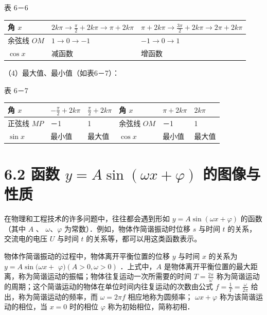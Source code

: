 \documentclass[10pt]{article}
\begin{document}
表 6－6

\begin{center}
\begin{tabular}{|l|l|l|}
\hline
角 \(x\) & \(2 k \pi \rightarrow \frac{\pi}{2}+2 k \pi \rightarrow \pi+2 k \pi\) & \(\pi+2 k \pi \rightarrow \frac{3 \pi}{2}+2 k \pi \rightarrow 2 \pi+2 k \pi\) \\
\hline
余弦线 \(O M\) & \(1 \rightarrow 0 \rightarrow-1\) & \(-1 \rightarrow 0 \rightarrow 1\) \\
\hline
\(\cos x\) & 减函数 & 增函数 \\
\hline
\end{tabular}
\end{center}

（4）最大值、最小值（如表6－7）：

表 6－7

\begin{center}
\begin{tabular}{|l|l|l|l|l|l|}
\hline
角 \(x\) & \(-\frac{\pi}{2}+2 k \pi\) & \(\frac{\pi}{2}+2 k \pi\) & 角 \(x\) & \(\pi+2 k \pi\) & \(2 k \pi\) \\
\hline
正弦线 \(M P\) & －1 & 1 & 余弦线 \(O M\) & －1 & 1 \\
\hline
\(\sin x\) & 最小值 & 最大值 & \(\cos x\) & 最小值 & 最大值 \\
\hline
\end{tabular}
\end{center}

\section*{6.2 函数 \(y=A \sin (\omega x+\varphi)\) 的图像与性质}
在物理和工程技术的许多问题中，往往都会遇到形如 \(y=A \sin (\omega x+\varphi)\) 的函数（其中 \(A\) 、 \(\omega 、 \varphi\) 为常数）．例如，物体作简谐振动时位移 \(s\) 与时间 \(t\) 的关系，交流电的电压 \(U\) 与时间 \(t\) 的关系等，都可以用这类函数表示。

物体作简谐振动的过程中，物体离开平衡位置的位移 \(y\) 与时间 \(x\) 的关系为 \(y=A \sin (\omega x+\) \(\varphi)(A>0, \omega>0)\) ．上式中，\(A\) 是物体离开平衡位置的最大距离，称为简谐运动的振幅；物体往复运动一次所需要的时间 \(T=\frac{2 \pi}{\omega}\) 称为简谐运动的周期；这个简谐运动的物体在单位时间内往复运动的次数由公式 \(f=\frac{1}{T}=\frac{\omega}{2 \pi}\) 给出，称为简谐运动的频率，而 \(\omega=2 \pi f\) 相应地称为圆频率； \(\omega x+\varphi\) 称为该简谐运动的相位，当 \(x=0\) 时的相位 \(\varphi\) 称为初始相位，简称初相．
\end{document}
